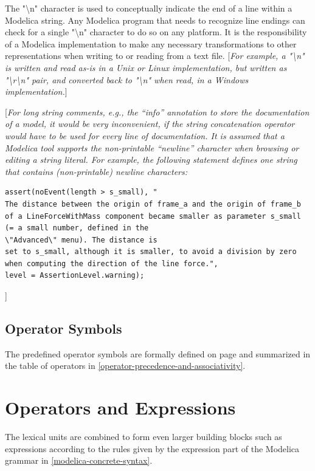 \documentclass[10pt,a4paper]{report}
\def\doublelabel#1{\label{#1}\hypertarget{#1}{}}
\begin{document}
The "\textbackslash{}n" character is used to conceptually indicate the
end of a line within a Modelica string. Any Modelica program that needs
to recognize line endings can check for a single "\textbackslash{}n"
character to do so on any platform. It is the responsibility of a
Modelica implementation to make any necessary transformations to other
representations when writing to or reading from a text file.
{[}\emph{For example, a "\textbackslash{}n" is written and read as-is in
a Unix or Linux implementation, but written as
"\textbackslash{}r\textbackslash{}n" pair, and converted back to
"\textbackslash{}n" when read, in a Windows implementation.}{]}

{[}\emph{For long string comments, e.g., the ``info'' annotation to
store the documentation of a model, it would be very inconvenient, if
the string concatenation operator would have to be used for every line
of documentation. It is assumed that a Modelica tool supports the
non-printable ``newline'' character when browsing or editing a string
literal. For example, the following statement defines one string that
contains (non-printable) newline characters:}

\begin{lstlisting}[language=modelica]
assert(noEvent(length > s_small), "
The distance between the origin of frame_a and the origin of frame_b
of a LineForceWithMass component became smaller as parameter s_small
(= a small number, defined in the
\"Advanced\" menu). The distance is
set to s_small, although it is smaller, to avoid a division by zero
when computing the direction of the line force.",
level = AssertionLevel.warning);
\end{lstlisting}
]
\section{Operator Symbols}\doublelabel{operator-symbols}

The predefined operator symbols are formally defined on page \pageref{lexical-conventions} and
summarized in the table of operators in \ref{operator-precedence-and-associativity}.

\chapter{Operators and Expressions}\doublelabel{operators-and-expressions}

The lexical units are combined to form even larger building blocks such
as expressions according to the rules given by the expression part of
the Modelica grammar in \ref{modelica-concrete-syntax}.
\end{document}
